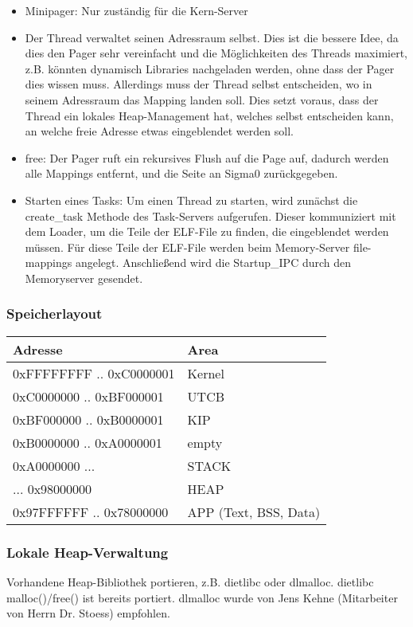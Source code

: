\begin{itemize}
	\item Minipager: Nur zuständig für die Kern-Server
	
	\item Der Thread verwaltet seinen Adressraum selbst. Dies ist die bessere Idee, da dies den Pager sehr vereinfacht und die Möglichkeiten des Threads maximiert, z.B. könnten dynamisch Libraries nachgeladen werden, ohne dass der Pager dies wissen muss. Allerdings muss  der Thread selbst entscheiden, wo in seinem Adressraum das Mapping landen soll. Dies setzt voraus, dass der Thread ein lokales Heap-Management hat, welches selbst entscheiden kann, an welche freie Adresse etwas eingeblendet werden soll.
	
	\item free: Der Pager ruft ein rekursives Flush auf die Page auf, dadurch werden alle Mappings entfernt, und die Seite an Sigma0 zurückgegeben.
    \item Starten eines Tasks: Um einen Thread zu starten, wird zunächst
        die create\_task Methode des Task-Servers aufgerufen. Dieser
        kommuniziert mit dem Loader, um die Teile der ELF-File zu
        finden, die eingeblendet werden müssen. Für diese Teile der
        ELF-File werden beim Memory-Server file-mappings angelegt.
        Anschließend wird die Startup\_IPC durch den Memoryserver
        gesendet.
\end{itemize}

\subsubsection{Speicherlayout}
\begin{tabular}{|l|l|}
\hline
Adresse & Area \\
\hline
0xFFFFFFFF .. 0xC0000001 & Kernel \\
\hline
0xC0000000 .. 0xBF000001 & UTCB \\
\hline
0xBF000000 .. 0xB0000001 & KIP \\
\hline
0xB0000000 .. 0xA0000001 & empty \\
\hline
0xA0000000 ... & STACK \\
\hline
... 0x98000000 & HEAP \\
\hline
0x97FFFFFF .. 0x78000000 & APP (Text, BSS, Data) \\
\hline
\end{tabular}
\subsubsection{Lokale Heap-Verwaltung}

Vorhandene Heap-Bibliothek portieren, z.B. dietlibc oder dlmalloc. dietlibc malloc()/free() ist bereits portiert. dlmalloc wurde von Jens Kehne (Mitarbeiter von Herrn Dr. Stoess) empfohlen.

